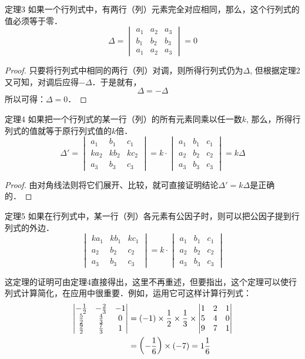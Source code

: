 \begin{blk}{定理3}
 如果一个行列式中，有两行（列）元素完全对应相同，那么，这个行列式的值必须等于零．   
 \[\Delta=\begin{vmatrix}
     a_1&a_2&a_3\\ b_1&b_2&b_3\\a_1&a_2&a_3
 \end{vmatrix}=0\]
\end{blk}

\begin{proof}
只要将行列式中相同的两行（列）对调，则所得行列式仍为$\Delta$, 但根据定理2又可知，对调后应得$-\Delta$．于是就有，    
\[\Delta=-\Delta\]
所以可得：$\Delta=0$．
\end{proof}

\begin{blk}{定理4}
如果把一个行列式的某一行（列）的所有元素同乘以任一数$k$, 那么，所得行列式的值就等于原行列式值的$k$倍．
\[\Delta'=\begin{vmatrix}
    a_1&b_1&c_1\\ka_2&kb_2&kc_2\\a_3&b_3&c_3
\end{vmatrix}=k\cdot \begin{vmatrix}
    a_1&b_1&c_1\\a_2&b_2&c_2\\a_3&b_3&c_3
\end{vmatrix}=k\Delta\]
\end{blk}

\begin{proof}
由对角线法则将它们展开、比较，就可直接证明结论$\Delta'=k\Delta$是正确的．
\end{proof}

\begin{blk}{定理5}
    如果在行列式中，某一行（列）各元素有公因子时，则可以把公因子提到行列式的外边．
\[\begin{vmatrix}
    ka_1&kb_1&kc_1\\a_2&b_2&c_2\\a_3&b_3&c_3
\end{vmatrix}=k\cdot \begin{vmatrix}
    a_1&b_1&c_1\\a_2&b_2&c_2\\a_3&b_3&c_3
\end{vmatrix}
    \]
\end{blk}

这定理的证明可由定理4直接得出，这里不再重述，但要指出，这个定理可以使行列式计算简化，在应用中很重要．例如，运用它可这样计算行列式：
\[\begin{split}
\begin{vmatrix}
    -\tfrac{1}{2}&-\tfrac{2}{3}&-1\\
    \tfrac{5}{2}&\tfrac{4}{3}&0\\
    \tfrac{9}{2}&\tfrac{7}{3}&1
\end{vmatrix}&=(-1)\times\dfrac{1}{2}\times\dfrac{1}{3}\times\begin{vmatrix}
    1&2&1\\5&4&0\\9&7&1
\end{vmatrix}\\
&=\left(-\dfrac{1}{6}\right)\times(-7)=1\dfrac{1}{6}
\end{split}\]

